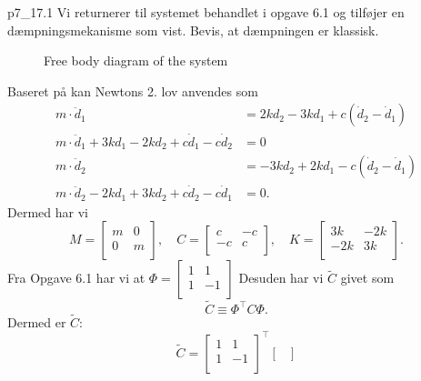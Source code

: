 
\begin{problemwithimage}{p7_1}{7.1}
  Vi returnerer til systemet behandlet i opgave 6.1 og tilføjer en dæmpningsmekanisme som vist.
  Bevis, at dæmpningen er klassisk.
\end{problemwithimage}
  
\begin{figure}[ht]
    \centering
    \caption{Free body diagram of the system}
    \label{fig:p7_1fbd}
\end{figure}

\begin{derivation}
  Baseret på  kan Newtons 2. lov anvendes som
  \begin{align*}
    m \cdot \ddot{d}_1 &= 2k d_2 - 3k d_1 + c (\dot{d}_2 - \dot{d}_1) \\
    m \cdot \ddot{d}_1 + 3k d_1 - 2k d_2 + c \dot{d}_1 - c \dot{d}_2 &= 0 \\
    m \cdot \ddot{d}_2 &= - 3k d_2 + 2kd_1 - c (\dot{d}_2 - \dot{d}_1) \\
    m \cdot \ddot{d}_2 - 2k d_1 + 3k d_2 + c \dot{d}_2 - c \dot{d}_1 &= 0
  .\end{align*}
  Dermed har vi
\[ 
  M = \begin{bmatrix}
  m & 0\\
  0 & m\\
  \end{bmatrix}, \quad C = \begin{bmatrix}
  c & -c\\
  -c & c\\
  \end{bmatrix}, \quad K = \begin{bmatrix}
  3k & -2k\\
  -2k & 3k\\
  \end{bmatrix}
.\]
Fra Opgave 6.1 har vi at $\Phi = \begin{bmatrix}
1 & 1\\
1 & -1\\
\end{bmatrix}$
  Desuden har vi $\tilde{C}$ givet som
  \[ 
    \tilde{C} \equiv \Phi^{\intercal} C \Phi 
  .\]
  Dermed er $\tilde{C}$:
  \[
    \tilde{C} = \begin{bmatrix}
    1 & 1\\
    1 & -1\\
    \end{bmatrix}^{\intercal} \begin{bmatrix}

\end{bmatrix}\]
\end{derivation}
